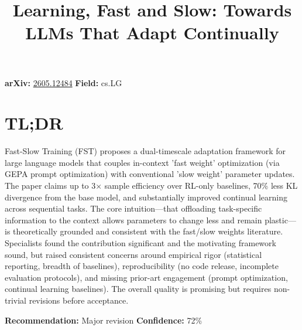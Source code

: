 \documentclass[11pt]{article}
\title{Learning, Fast and Slow: Towards LLMs That Adapt Continually}
\date{}
\begin{document}
\maketitle

\noindent\textbf{arXiv:} \href{https://arxiv.org/abs/2605.12484}{2605.12484} \quad \textbf{Field:} cs.LG\\

\section*{TL;DR}
Fast-Slow Training (FST) proposes a dual-timescale adaptation framework for large language models that couples in-context 'fast weight' optimization (via GEPA prompt optimization) with conventional 'slow weight' parameter updates. The paper claims up to 3× sample efficiency over RL-only baselines, 70\% less KL divergence from the base model, and substantially improved continual learning across sequential tasks. The core intuition—that offloading task-specific information to the context allows parameters to change less and remain plastic—is theoretically grounded and consistent with the fast/slow weights literature. Specialists found the contribution significant and the motivating framework sound, but raised consistent concerns around empirical rigor (statistical reporting, breadth of baselines), reproducibility (no code release, incomplete evaluation protocols), and missing prior-art engagement (prompt optimization, continual learning baselines). The overall quality is promising but requires non-trivial revisions before acceptance.

\textbf{Recommendation:} Major revision \quad \textbf{Confidence:} 72\%\\
\end{document}
